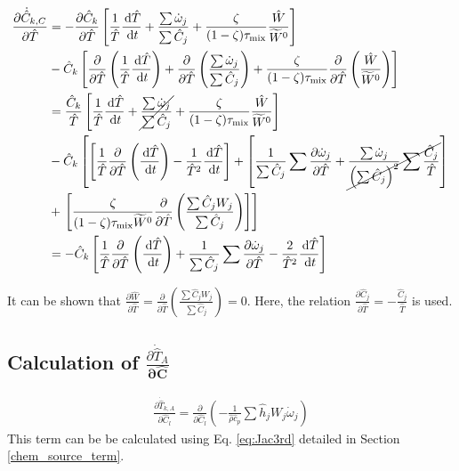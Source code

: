 \begin{align}\label{eq:JacCCT}
\frac{\partial {\dot{\hat{C}}_{k,C}}}{\partial \hat{T}} &= - \frac{\partial \hat{C}_{k}}{\partial \hat{T}} \left[ \frac{1}{\hat{T}} \frac{\,\mathrm{d} \hat{T}}{\,\mathrm{d} t} + \frac{\sum{\dot{\omega}_j}}{\sum{\hat{C}_j}}+\frac{\zeta}{(1-\zeta)\tau_{\rm mix}}\frac{\hat{W}}{\widetilde{W}^0} \right] \notag\\
& - \hat{C}_{k} \left[ \frac{\partial}{\partial \hat{T}} \left( \frac{1}{\hat{T}} \frac{\,\mathrm{d} \hat{T}}{\,\mathrm{d} t} \right) + \frac{\partial}{\partial \hat{T}} \left( \frac{\sum{\dot{\omega}_j}}{\sum{\hat{C}_j}}\right) + \frac{\zeta}{(1-\zeta)\tau_{\rm mix}} \frac{\partial}{\partial \hat{T}} \left( \frac{\hat{W}}{\widetilde{W}^0} \right)\right] \\
&= \frac{\hat{C}_{k}}{\hat{T}} \left[ \frac{1}{\hat{T}} \frac{\,\mathrm{d} \hat{T}}{\,\mathrm{d} t} + \cancel{\frac{\sum{\dot{\omega}_j}}{\sum{\hat{C}_j}}}+\frac{\zeta}{(1-\zeta)\tau_{\rm mix}}\frac{\hat{W}}{\widetilde{W}^0} \right] \notag\\
& - \hat{C}_{k} \left [ \left[ \frac{1}{\hat{T}} \frac{\partial}{\partial \hat{T}} \left( \frac{\,\mathrm{d} \hat{T}}{\,\mathrm{d} t} \right) - \frac{1}{\hat{T}^2} \frac{\,\mathrm{d} \hat{T}}{\,\mathrm{d} t} \right] + \left[\frac{1}{\sum{\hat{C}_j}} \sum{\frac{\partial \dot{\omega}_j}{\partial \hat{T}}} + \cancel{\frac{\sum{\dot{\omega}_j}}{\left(\sum{\hat{C}_j}\right)^2} \sum{\frac{\hat{C}_j}{\hat{T}}}} \right] \right. \notag\\
&+  \left. \left[\frac{\zeta}{(1-\zeta)\tau_{\rm mix}\widetilde{W}^0} \frac{\partial}{\partial \hat{T}} \left( \frac{\sum{\hat{C}_j W_j}}{\sum{\hat{C}_j}} \right) \right] \right] \\
&= - \hat{C}_{k} \left[ \frac{1}{\hat{T}} \frac{\partial}{\partial \hat{T}} \left( \frac{\,\mathrm{d} \hat{T}}{\,\mathrm{d} t} \right) + \frac{1}{\sum{\hat{C}_j}} \sum{\frac{\partial \dot{\omega}_j}{\partial \hat{T}}} - \frac{2}{\hat{T}^2}\frac{\,\mathrm{d} \hat{T}}{\,\mathrm{d} t}\right]
\end{align}

It can be shown that $\frac{\partial \hat{W}}{\partial \hat{T}} = \frac{\partial}{\partial \hat{T}} \left( \frac{\sum{\hat{C}_j W_j}}{\sum{\hat{C}_j}} \right) = 0 $. Here, the relation $\frac{\partial \hat{C}_j}{\partial \hat{T}} = - \frac{\hat{C}_j}{\hat{T}}$ is used.


\subsection*{Calculation of $\frac{\partial \dot{\hat{T}}_A}{\mathbf{\partial \hat{C}}}$}
\begin{align}\label{eq:JacTAC}
\frac{\partial {\dot{\hat{T}}_{k,A}}}{\partial \hat{C}_{l}} = \frac{\partial}{\partial \hat{C}_{l}} \left( -\frac{1}{\hat{\rho} \hat{c}_p} \sum{\hat{h}_j W_j \dot{\omega}_j }\right)
\end{align}
This term can be be calculated using Eq. \ref{eq:Jac3rd} detailed in Section \ref{chem_source_term}.

